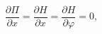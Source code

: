 \begin{equation}
\label{eqmotion1}
\frac{\partial \Pi}{\partial x} =
\frac{\partial H}{\partial x} =
\frac{\partial H}{\partial \varphi} = 0,
\end{equation}

